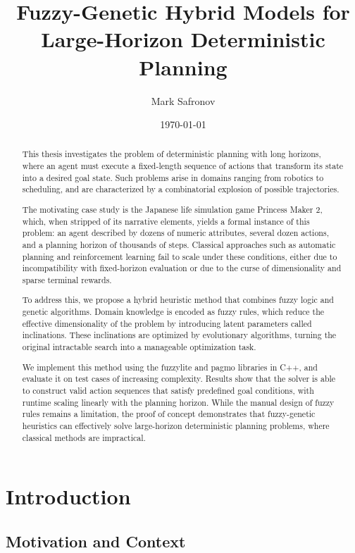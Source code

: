 \documentclass[12pt, a4paper]{report}
\title{Fuzzy-Genetic Hybrid Models for Large-Horizon Deterministic Planning}
\author{Mark Safronov}
\date{\today}
\begin{document}
	
	
	
	\begin{abstract}
		This thesis investigates the problem of deterministic planning with long horizons, where an agent must execute a fixed-length sequence of actions that transform its state into a desired goal state. Such problems arise in domains ranging from robotics to scheduling, and are characterized by a combinatorial explosion of possible trajectories.
		
		The motivating case study is the Japanese life simulation game Princess Maker 2, which, when stripped of its narrative elements, yields a formal instance of this problem: an agent described by dozens of numeric attributes, several dozen actions, and a planning horizon of thousands of steps. Classical approaches such as automatic planning and reinforcement learning fail to scale under these conditions, either due to incompatibility with fixed-horizon evaluation or due to the curse of dimensionality and sparse terminal rewards.
		
		To address this, we propose a hybrid heuristic method that combines fuzzy logic and genetic algorithms. Domain knowledge is encoded as fuzzy rules, which reduce the effective dimensionality of the problem by introducing latent parameters called inclinations. These inclinations are optimized by evolutionary algorithms, turning the original intractable search into a manageable optimization task.
		
		We implement this method using the fuzzylite and pagmo libraries in C++, and evaluate it on test cases of increasing complexity. Results show that the solver is able to construct valid action sequences that satisfy predefined goal conditions, with runtime scaling linearly with the planning horizon. While the manual design of fuzzy rules remains a limitation, the proof of concept demonstrates that fuzzy-genetic heuristics can effectively solve large-horizon deterministic planning problems, where classical methods are impractical.
	\end{abstract}
	\tableofcontents
	
	\chapter{Introduction}
	
	\section{Motivation and Context}
	
\end{document}
